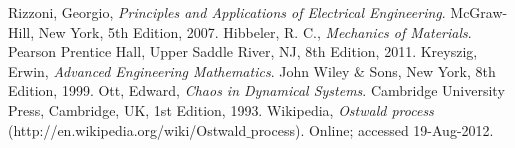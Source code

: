 \documentclass{article}
\begin{document}
\begin{thebibliography}{9}
  Rizzoni, Georgio,
  {\it Principles and Applications of Electrical Engineering}.
  McGraw-Hill, New York,
  5th Edition,
  2007.
Hibbeler, R. C.,
{\it Mechanics of Materials}.
Pearson Prentice Hall, Upper Saddle River, NJ, 8th Edition, 2011.
Kreyszig, Erwin,
{\it Advanced Engineering Mathematics}.
John Wiley \& Sons, New York, 8th Edition, 1999.
Ott, Edward,
{\it Chaos in Dynamical Systems}.
Cambridge University Press, Cambridge, UK, 1st Edition, 1993.
Wikipedia, 
{\it Ostwald process} (http://en.wikipedia.org/wiki/Ostwald$\_$process).
Online; accessed 19-Aug-2012.
\end{thebibliography}
\end{document}
